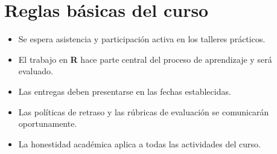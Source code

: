 \documentclass[
  11pt,
]{article}
\providecommand{\tightlist}{%
  \setlength{\itemsep}{0pt}\setlength{\parskip}{0pt}}
\begin{document}
\hypertarget{reglas-buxe1sicas-del-curso}{%
\section{Reglas básicas del curso}\label{reglas-buxe1sicas-del-curso}}

\begin{itemize}
\tightlist
\item
  Se espera asistencia y participación activa en los talleres prácticos.
\item
  El trabajo en \textbf{R} hace parte central del proceso de aprendizaje
  y será evaluado.
\item
  Las entregas deben presentarse en las fechas establecidas.
\item
  Las políticas de retraso y las rúbricas de evaluación se comunicarán
  oportunamente.
\item
  La honestidad académica aplica a todas las actividades del curso.
\end{itemize}
\end{document}
